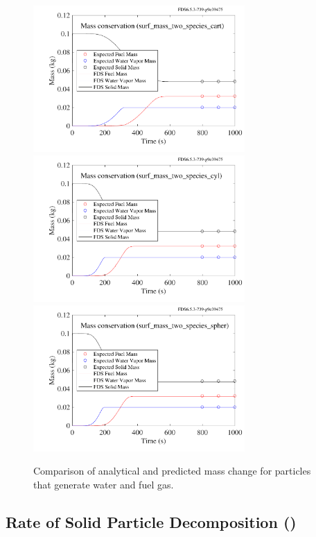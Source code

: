 \documentclass[11pt]{book}
\begin{document}
\begin{figure}[!htb]
\centering
\includegraphics[height=2.2in]{SCRIPT_FIGURES/surf_mass_two_species_cart} \\
\includegraphics[height=2.2in]{SCRIPT_FIGURES/surf_mass_two_species_cyl} \\
\includegraphics[height=2.2in]{SCRIPT_FIGURES/surf_mass_two_species_spher}
\caption[The  test cases]{Comparison of analytical and predicted mass change for particles that generate water and fuel gas.}
\label{surf_mass_two_species}
\end{figure}

\clearpage

\subsection{Rate of Solid Particle Decomposition (\texorpdfstring{}{part\_baking\_soda})}
\label{sec:solid_particle_decomposition}
\label{part_baking_soda}
\end{document}
